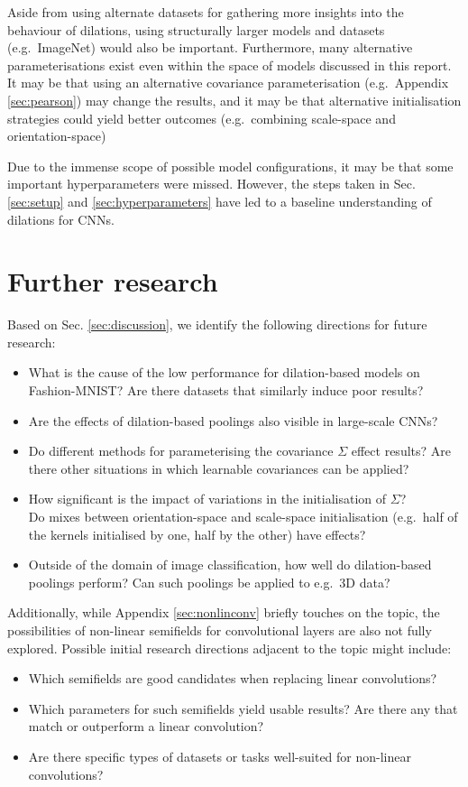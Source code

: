 \documentclass[a4paper, 12pt]{report}
\begin{document}
Aside from using alternate datasets for gathering more insights into the behaviour of dilations, using structurally larger models and datasets (e.g.\ ImageNet) would also be important. Furthermore, many alternative parameterisations exist even within the space of models discussed in this report. It may be that using an alternative covariance parameterisation (e.g.\ Appendix \ref{sec:pearson}) may change the results, and it may be that alternative initialisation strategies could yield better outcomes (e.g.\ combining scale-space and orientation-space)

Due to the immense scope of possible model configurations, it may be that some important hyperparameters were missed. However, the steps taken in Sec. \ref{sec:setup} and \ref{sec:hyperparameters} have led to a baseline understanding of dilations for CNNs.



\newpage
\section{Further research}
Based on Sec. \ref{sec:discussion}, we identify the following directions for future research:
\begin{itemize}
\setlength{\itemsep}{1pt}
	\item What is the cause of the low performance for dilation-based models on Fashion-MNIST? Are there datasets that similarly induce poor results?
	\item Are the effects of dilation-based poolings also visible in large-scale CNNs?
	\item Do different methods for parameterising the covariance $\Sigma$ effect results? 
		  Are there other situations in which learnable covariances can be applied?
	\item How significant is the impact of variations in the initialisation of $\Sigma$? \\
	      Do mixes between orientation-space and scale-space initialisation (e.g.\ half of the kernels initialised by one, half by the other) have effects?
	 \item Outside of the domain of image classification, how well do dilation-based poolings perform? Can such poolings be applied to e.g.\ 3D data?
\end{itemize}
Additionally, while Appendix \ref{sec:nonlinconv} briefly touches on the topic, the possibilities of non-linear semifields for convolutional layers are also not fully explored.
Possible initial research directions adjacent to the topic might include:
\begin{itemize}
\setlength{\itemsep}{1pt}
	\item Which semifields are good candidates when replacing linear convolutions?
	\item Which parameters for such semifields yield usable results? Are there any that match or outperform a linear convolution?
	\item Are there specific types of datasets or tasks well-suited for non-linear convolutions?
\end{itemize}
\end{document}
